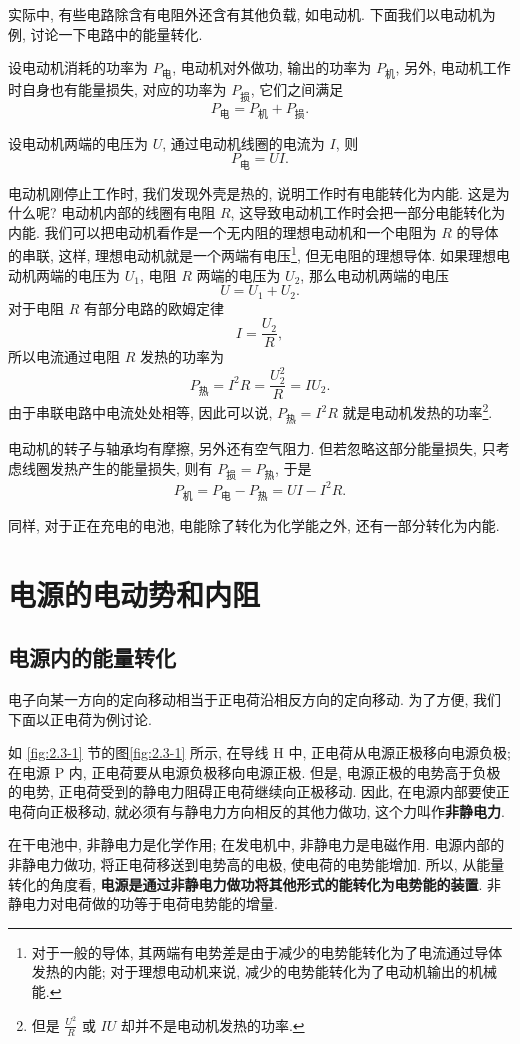 \documentclass[UTF8,openany,fontset=fandol]{ctexbook}
\theoremstyle{chinesetextbook}
\begin{document}
实际中, 有些电路除含有电阻外还含有其他负载, 如电动机. 下面我们以电动机为例, 讨论一下电路中的能量转化.

设电动机消耗的功率为 $P_\text{电}$, 电动机对外做功, 输出的功率为 $P_\text{机}$, 另外, 电动机工作时自身也有能量损失, 对应的功率为 $P_\text{损}$, 它们之间满足
\[
P_\text{电}=P_\text{机}+P_\text{损}.
\]

设电动机两端的电压为 $U$, 通过电动机线圈的电流为 $I$, 则
\[
P_\text{电}=UI.
\]

电动机刚停止工作时, 我们发现外壳是热的, 说明工作时有电能转化为内能. 这是为什么呢? 电动机内部的线圈有电阻 $R$, 这导致电动机工作时会把一部分电能转化为内能. 我们可以把电动机看作是一个无内阻的理想电动机和一个电阻为 $R$ 的导体的串联, 这样, 理想电动机就是一个两端有电压\footnote{对于一般的导体, 其两端有电势差是由于减少的电势能转化为了电流通过导体发热的内能; 对于理想电动机来说, 减少的电势能转化为了电动机输出的机械能.}, 但无电阻的理想导体. 如果理想电动机两端的电压为 $U_1$, 电阻 $R$ 两端的电压为 $U_2$, 那么电动机两端的电压
\[
U=U_1+U_2.
\]
对于电阻 $R$ 有部分电路的欧姆定律
\[
I=\frac{U_2}{R},
\]
所以电流通过电阻 $R$ 发热的功率为
\[
P_\text{热}=I^2R=\frac{U_2^2}{R}=IU_2.
\]
由于串联电路中电流处处相等, 因此可以说, $P_\text{热}=I^2R$ 就是电动机发热的功率\footnote{但是 $\displaystyle\frac{U^2}{R}$ 或 $IU$ 却并不是电动机发热的功率.}.

电动机的转子与轴承均有摩擦, 另外还有空气阻力. 但若忽略这部分能量损失, 只考虑线圈发热产生的能量损失, 则有 $P_\text{损}=P_\text{热}$, 于是
\[
P_\text{机}=P_\text{电}-P_\text{热}=UI-I^2R.
\]

同样, 对于正在充电的电池, 电能除了转化为化学能之外, 还有一部分转化为内能.
\section{电源的电动势和内阻}
\subsection{电源内的能量转化}
电子向某一方向的定向移动相当于正电荷沿相反方向的定向移动. 为了方便, 我们下面以正电荷为例讨论.

如 \ref{fig:2.3-1} 节的图\ref{fig:2.3-1} 所示, 在导线 H 中, 正电荷从电源正极移向电源负极; 在电源 P 内, 正电荷要从电源负极移向电源正极. 但是, 电源正极的电势高于负极的电势, 正电荷受到的静电力阻碍正电荷继续向正极移动. 因此, 在电源内部要使正电荷向正极移动, 就必须有与静电力方向相反的其他力做功, 这个力叫作\textbf{非静电力}.

在干电池中, 非静电力是化学作用; 在发电机中, 非静电力是电磁作用. 电源内部的非静电力做功, 将正电荷移送到电势高的电极, 使电荷的电势能增加. 所以, 从能量转化的角度看, \textbf{电源是通过非静电力做功将其他形式的能转化为电势能的装置}. 非静电力对电荷做的功等于电荷电势能的增量.
\end{document}
